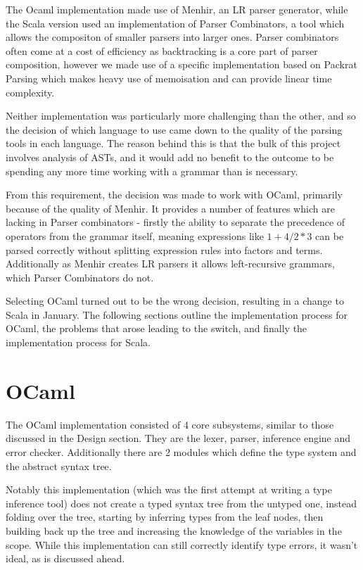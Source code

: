 \documentclass[british, twoside, openright]{bhamthesis}
\theoremstyle{definition}
\begin{document}
  The Ocaml implementation made use of Menhir, an LR parser generator, while the Scala version used an implementation of Parser Combinators\autocite{Hutton1996}, a tool which allows the compositon of smaller parsers into larger ones. Parser combinators often come at a cost of efficiency as backtracking is a core part of parser composition, however we made use of a specific implementation based on Packrat Parsing\autocite{Ford2006} which makes heavy use of memoisation and can provide linear time complexity.

  Neither implementation was particularly more challenging than the other, and so the decision of which language to use came down to the quality of the parsing tools in each language. The reason behind this is that the bulk of this project involves analysis of ASTs, and it would add no benefit to the outcome to be spending any more time working with a grammar than is necessary.

  From this requirement, the decision was made to work with OCaml, primarily because of the quality of Menhir. It provides a number of features which are lacking in Parser combinators - firstly the ability to separate the precedence of operators from the grammar itself, meaning expressions like $1 + 4 / 2 * 3$ can be parsed correctly without splitting expression rules into factors and terms. Additionally as Menhir creates LR parsers it allows left-recursive grammars, which Parser Combinators do not.

  Selecting OCaml turned out to be the wrong decision, resulting in a change to Scala in January. The following sections outline the implementation process for OCaml, the problems that arose leading to the switch, and finally the implementation process for Scala.

  \section{OCaml}
    The OCaml implementation consisted of 4 core subsystems, similar to those discussed in the Design section. They are the lexer, parser, inference engine and error checker. Additionally there are 2 modules which define the type system and the abstract syntax tree.

    Notably this implementation (which was the first attempt at writing a type inference tool) does not create a typed syntax tree from the untyped one, instead folding over the tree, starting by inferring types from the leaf nodes, then building back up the tree and increasing the knowledge of the variables in the scope. While this implementation can still correctly identify type errors, it wasn't ideal, as is discussed ahead.
\end{document}
